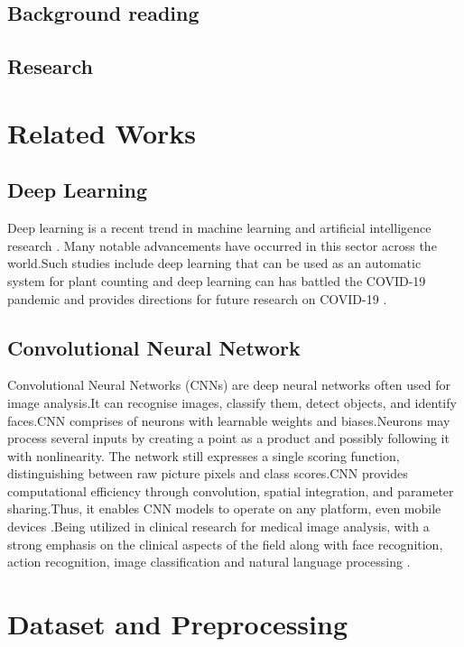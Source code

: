 \documentclass[conference]{IEEEtran}
\begin{document}
\subsection{Background reading}

\subsection{Research}

\section{Related Works}

\subsection{Deep Learning}
Deep learning is a recent trend in machine learning and artificial intelligence research \cite{b10}.
Many notable advancements have occurred in this sector across the world.Such studies include deep learning that can be used as an automatic system for plant counting \cite{b11,b12} and
deep learning can has battled the COVID-19 pandemic and provides directions for future research on COVID-19 \cite{b13}.
\subsection{Convolutional Neural Network}
Convolutional Neural Networks (CNNs) are deep neural networks often used for image analysis.It can recognise images, classify them, detect objects, and identify faces.CNN comprises of neurons with learnable weights and biases.Neurons may process several inputs by creating a point as a product and possibly following it with nonlinearity. The network still expresses a single scoring function, distinguishing between raw picture pixels and class scores.CNN provides computational efficiency through convolution, spatial integration, and parameter sharing.Thus, it enables CNN models to operate on any platform, even mobile devices \cite{b14}.Being utilized in clinical research for medical image analysis, with a strong emphasis on the clinical aspects of the field \cite{b15} along with face recognition, action recognition, image classification and natural language processing \cite{b16}.

\section{Dataset and Preprocessing}
\end{document}
